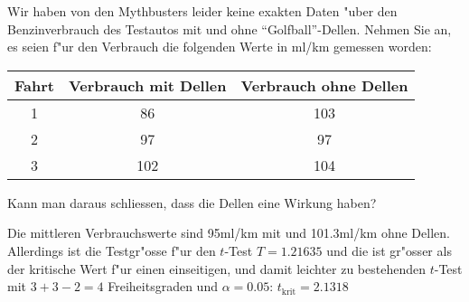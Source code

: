 Wir haben von den Mythbusters leider keine exakten Daten "uber den
Benzinverbrauch des Testautos mit und ohne ``Golfball''-Dellen.
Nehmen Sie an, es seien f"ur den Verbrauch die folgenden Werte in ml/km
gemessen worden:
\begin{center}
\begin{tabular}{ccc}
\hline
Fahrt&Verbrauch mit Dellen&Verbrauch ohne Dellen\\
\hline
1&86&103\\
2&97&97\\
3&102&104\\
\hline
\end{tabular}
\end{center}
Kann man daraus schliessen, dass die Dellen eine Wirkung haben?

\begin{loesung}
Die mittleren Verbrauchswerte sind 95ml/km mit und 101.3ml/km ohne
Dellen. Allerdings ist die Testgr"osse f"ur den $t$-Test
$T=1.21635$ und die ist gr"osser als der kritische Wert f"ur
einen einseitigen, und damit leichter zu bestehenden $t$-Test mit
$3+3-2=4$ Freiheitsgraden und
$\alpha=0.05$: $t_{\text{krit}}=2.1318$

\end{loesung}

